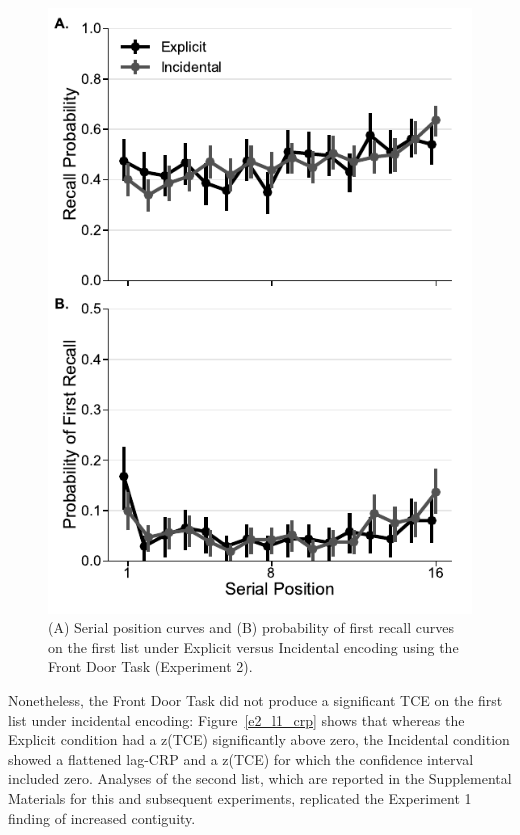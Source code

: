 \documentclass[man,natbib,floatsintext]{apa6} %
\begin{document}
\begin{figure}
\includegraphics{figures/E2_spc_list1.pdf}
\caption{(A) Serial position curves and (B) probability of first recall curves on the first list under Explicit versus Incidental encoding using the Front Door Task (Experiment 2). \spcpaneltext}
\label{e2_l1_spc}
\end{figure}

\color{black}

Nonetheless, the Front Door Task did not produce a significant TCE on the first list under incidental encoding: Figure~\ref{e2_l1_crp} shows that whereas the Explicit condition \color{red} had a \label{done-11} z(TCE) significantly above zero\color{black}, the Incidental condition showed a flattened lag-CRP and a z(TCE) for which the confidence interval included zero. \color{red} Analyses of the second list, which are reported in the Supplemental Materials for this and subsequent experiments, replicated the Experiment 1 finding of increased contiguity. \color{black}
\end{document}
